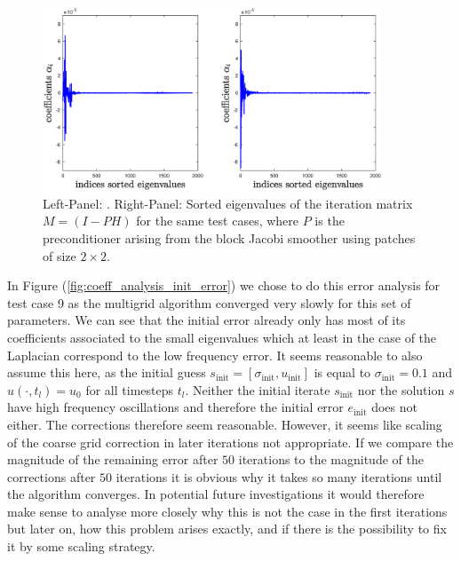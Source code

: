 \documentclass[../draft_1.tex]{subfiles}
\begin{document}
\begin{figure}
	\includegraphics[width=0.9\textwidth]{images/implementation/eigenvalues/eig_val_coeff_left_c_sm_right_c_cgc_50_it}
	\caption{Left-Panel: . Right-Panel: Sorted eigenvalues of the iteration matrix $M = (I - PH)$ for the same test cases, where $P$ is the preconditioner arising from the block Jacobi smoother using patches of size $2 \times 2$.}
	\label{fig:coeff_analysis}
\end{figure}

In Figure (\ref{fig:coeff_analysis_init_error}) we chose to do this error analysis for test case 9 as the multigrid algorithm converged very slowly for this set of parameters. We can see that the initial error already only has most of its coefficients associated to the small eigenvalues which at least in the case of the Laplacian correspond to the low frequency error. It seems reasonable to also assume this here, as the initial guess $s_{\text{init}} = [\sigma_{\text{init}}, u_{\text{init}}]$ is equal to $\sigma_{\text{init}} = 0.1$ and $u(\cdot, t_l) = u_0$ for all timesteps $t_l$. Neither the initial iterate $s_{\text{init}}$ nor the solution $s$ have high frequency oscillations and therefore the initial error $e_{\text{init}}$ does not either. The corrections therefore seem reasonable. However, it seems like scaling of the coarse grid correction in later iterations not appropriate. If we compare the magnitude of the remaining error after $50$ iterations to the magnitude of the corrections after $50$ iterations it is obvious why it takes so many iterations until the algorithm converges. In potential future investigations it would therefore make sense to analyse more closely why this is not the case in the first iterations but later on, how this problem arises exactly, and if there is the possibility to fix it by some scaling strategy. 
\end{document}
